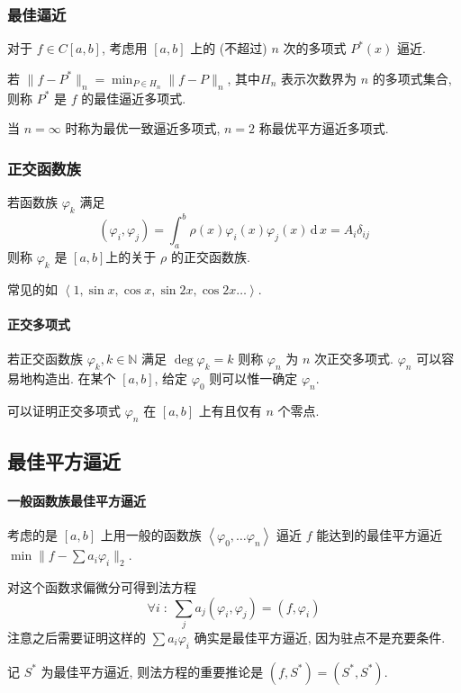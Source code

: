 \documentclass{ctexart}
\newcommand{\Nset}{\mathbb{N}}
\newcommand{\ud}{\,\mathrm{d}\,}
\begin{document}
\subsubsection{最佳逼近}
    对于 $f \in C[a,b]$, 考虑用 $[a,b]$ 上的 (不超过) $n$ 次的多项式 $P^*(x)$ 逼近.\par
    若 $\| f - P^* \|_{n} = \min_{P \in H_n} \| f - P\|_n $, 其中$H_n$ 表示次数界为 $n$ 的多项式集合,
    则称 $P^*$ 是 $f$ 的最佳逼近多项式.\par
    当 $n = \infty$ 时称为最优一致逼近多项式, $n = 2$ 称最优平方逼近多项式.\par

\subsubsection{正交函数族}
    若函数族 $\varphi_k$ 满足 \[
        (\varphi_i,\varphi_j) = \int_a^b \rho(x) \varphi_i(x) \varphi_j(x) \ud x = A_i\delta_{ij}\]
    则称 $\varphi_k$ 是 $[a,b]$上的关于 $\rho$ 的正交函数族.\par
    常见的如 $\left\langle 1, \sin x, \cos x, \sin 2x, \cos 2x \ldots \right\rangle$.\par
\paragraph{正交多项式}
    若正交函数族 $\varphi_k,k \in \Nset$ 满足 $\deg \varphi_k = k$ 则称 $\varphi_n$ 为 $n$ 次正交多项式.
    $\varphi_n$ 可以容易地构造出. 在某个 $[a,b]$, 给定 $\varphi_0$ 则可以惟一确定 $\varphi_n$.\par
    可以证明正交多项式 $\varphi_n$ 在 $[a,b]$ 上有且仅有 $n$ 个零点.

\subsection{最佳平方逼近}
\paragraph{一般函数族最佳平方逼近}
    考虑的是 $[a,b]$ 上用一般的函数族
    $\left\langle \varphi_0, \ldots \varphi_n \right\rangle$
    逼近 $f$ 能达到的最佳平方逼近 $ \min \| f - \sum a_i \varphi_i \|_2$.\par
    对这个函数求偏微分可得到法方程 \[
        \forall i\;:\;\sum_j a_j (\varphi_i, \varphi_j)  = (f, \varphi_i)
    \]
    注意之后需要证明这样的 $\sum a_i \varphi_i $ 确实是最佳平方逼近,
    因为驻点不是充要条件.\par
    记 $S^*$ 为最佳平方逼近, 则法方程的重要推论是 $(f, S^*) = (S^*, S^*)$.
\end{document}
